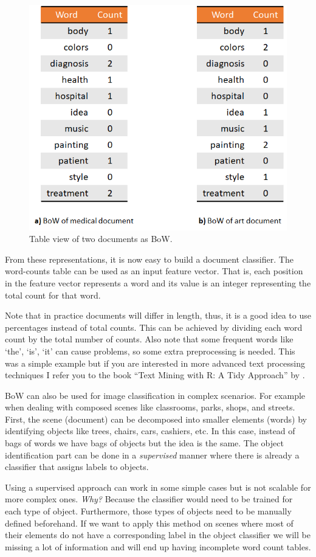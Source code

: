 \documentclass[
  11pt,
]{krantz}
\makeatletter
\newenvironment{kframe}{%
\medskip{}
\setlength{\fboxsep}{.8em}
 \def\at@end@of@kframe{}%
 \ifinner\ifhmode%
  \def\at@end@of@kframe{\end{minipage}}%
  \begin{minipage}{\columnwidth}%
 \fi\fi%
 \def\FrameCommand##1{\hskip\@totalleftmargin \hskip-\fboxsep
 \colorbox{shadecolor}{##1}\hskip-\fboxsep
     \hskip-\linewidth \hskip-\@totalleftmargin \hskip\columnwidth}%
 \MakeFramed {\advance\hsize-\width
   \@totalleftmargin\z@ \linewidth\hsize
   \@setminipage}}%
 {\par\unskip\endMakeFramed%
 \at@end@of@kframe}
\newenvironment{rmdblock}[1]
  {
  \begin{itemize}
  \renewcommand{\labelitemi}{
    \raisebox{-.7\height}[0pt][0pt]{
      {\setkeys{Gin}{width=3em,keepaspectratio}\texttt{[image: images/icons/\#1]}}
    }
  }
  \setlength{\fboxsep}{1em}
  \begin{kframe}
  \item
  }
  {
  \end{kframe}
  \end{itemize}
  }
\newenvironment{rmdgoodpractice}
  {\begin{rmdblock}{goodpractice}}
  {\end{rmdblock}}
\makeatother
\begin{document}
\begin{figure}

{\centering \includegraphics[width=0.5\linewidth]{images/bowTable} 

}

\caption{Table view of two documents as BoW.}\label{fig:bowTab}
\end{figure}

From these representations, it is now easy to build a document classifier. The word-counts table can be used as an input feature vector. That is, each position in the feature vector represents a word and its value is an integer representing the total count for that word.

\begin{rmdgoodpractice}
Note that in practice documents will differ in length, thus, it is a good idea to use percentages instead of total counts. This can be achieved by dividing each word count by the total number of counts. Also note that some frequent words like `the', `is', `it' can cause problems, so some extra preprocessing is needed. This was a simple example but if you are interested in more advanced text processing techniques I refer you to the book ``Text Mining with R: A Tidy Approach'' by \citet{silge2017}.
\end{rmdgoodpractice}

BoW can also be used for image classification in complex scenarios. For example when dealing with composed scenes like classrooms, parks, shops, and streets. First, the scene (document) can be decomposed into smaller elements (words) by identifying objects like trees, chairs, cars, cashiers, etc. In this case, instead of bags of words we have bags of objects but the idea is the same. The object identification part can be done in a \emph{supervised} manner where there is already a classifier that assigns labels to objects.

Using a supervised approach can work in some simple cases but is not scalable for more complex ones. \emph{Why?} Because the classifier would need to be trained for each type of object. Furthermore, those types of objects need to be manually defined beforehand. If we want to apply this method on scenes where most of their elements do not have a corresponding label in the object classifier we will be missing a lot of information and will end up having incomplete word count tables.
\end{document}
